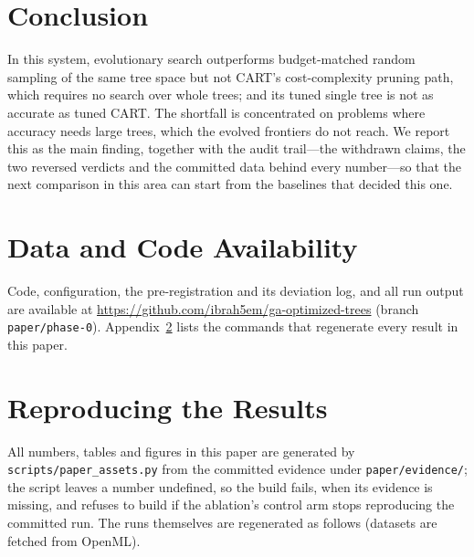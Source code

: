 \documentclass[11pt]{article}
\begin{document}
\section{Conclusion}
\label{sec:conclusion}

In this system, evolutionary search outperforms budget-matched random sampling of the
same tree space but not CART's cost-complexity pruning path, which requires no search over
whole trees; and its tuned single tree is not as accurate as tuned CART. The shortfall is
concentrated on problems where accuracy needs large trees, which the evolved frontiers do
not reach. We report this as the main finding, together with the audit trail---the
withdrawn claims, the two reversed verdicts and the committed data behind every
number---so that the next comparison in this area can start from the baselines that
decided this one.

\section*{Data and Code Availability}
Code, configuration, the pre-registration and its deviation log, and all run output are
available at \url{https://github.com/ibrah5em/ga-optimized-trees} (branch
\texttt{paper/phase-0}). Appendix~\ref{app:repro} lists the commands that regenerate every
result in this paper.




\appendix
\section{Reproducing the Results}
\label{app:repro}

All numbers, tables and figures in this paper are generated by
\texttt{scripts/paper\_assets.py} from the committed evidence under
\texttt{paper/evidence/}; the script leaves a number undefined, so the build fails, when
its evidence is missing, and refuses to build if the ablation's control arm stops
reproducing the committed run. The runs themselves are regenerated as follows (datasets
are fetched from OpenML).
\end{document}
